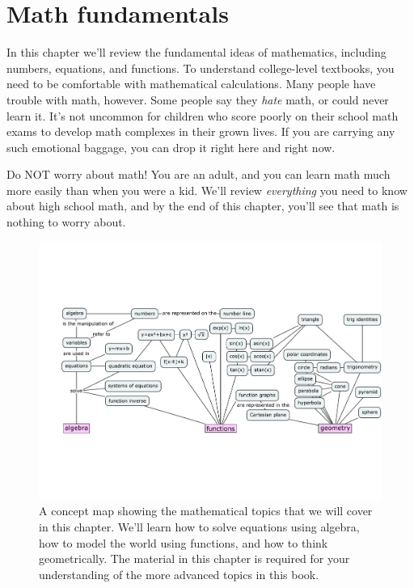 
%
%

\chapter{Math fundamentals}
\label{chapter:math_fundamentals}

In this chapter we'll review the fundamental ideas of mathematics, including numbers, equations, and functions.  
To understand college-level textbooks, you need to be comfortable with mathematical calculations.
Many people have trouble with math, however. 
Some people say they \emph{hate} math, or could never learn it. 
It's not uncommon for children who score poorly on their school math exams to develop math complexes in their grown lives.
If you are carrying any such emotional baggage, you can drop it right here and right now.

Do NOT worry about math! 
You are an adult, and you can learn math much more easily than when you were a kid.
We'll review \emph{everything} you need to know about high school math, and by the end of this chapter, 
you'll see that math is nothing to worry about.

\smallskip

\begin{figure}[H]
\centering
\! \includegraphics[width=1.01\textwidth]{figures/concept_maps/precalculus.pdf}
	\caption{A concept map showing the mathematical topics that we will cover in this chapter.
			We'll learn how to solve equations using algebra, 
			how to model the world using functions,
			and how to think geometrically.
			The material in this chapter is required for your understanding of the more advanced topics in this book.}
\label{fig:precalculus_concept_map}
\end{figure}
